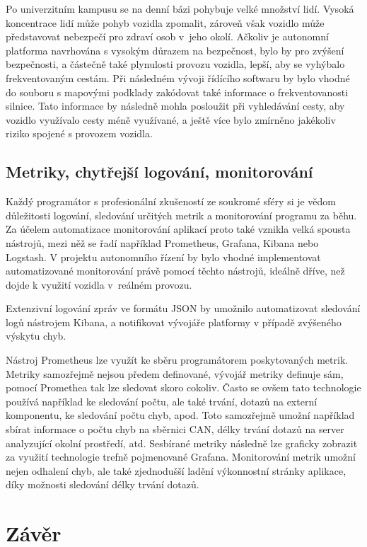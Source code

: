 \documentclass[czech, bachelor]{diploma}
\begin{document}
Po univerzitním kampusu se na denní bázi pohybuje velké množství lidí. Vysoká koncentrace lidí může pohyb vozidla zpomalit,
zároveň však vozidlo může představovat nebezpečí pro zdraví osob v~jeho okolí. Ačkoliv je autonomní platforma navrhována s vysokým
důrazem na bezpečnost, bylo by pro zvýšení bezpečnosti, a částečně také plynulosti provozu vozidla, lepší, aby se vyhýbalo
frekventovaným cestám. Při následném vývoji řídícího softwaru by bylo vhodné do souboru s mapovými podklady zakódovat také
informace o frekventovanosti silnice. Tato informace by následně mohla posloužit při vyhledávání cesty, aby vozidlo využívalo
cesty méně využívané, a ještě více bylo zmírněno jakékoliv riziko spojené s provozem vozidla.

\section{Metriky, chytřejší logování, monitorování}

Každý programátor s profesionální zkušeností ze soukromé sféry si je vědom důležitosti logování, sledování určitých metrik
a monitorování programu za běhu. Za účelem automatizace monitorování aplikací proto také vznikla velká spousta nástrojů, mezi něž
se řadí například Prometheus, Grafana, Kibana nebo Logstash. V projektu autonomního řízení by bylo vhodné implementovat
automatizované monitorování právě pomocí těchto nástrojů, ideálně dříve, než dojde k využití vozidla v~reálném provozu.

Extenzivní logování zpráv ve formátu JSON by umožnilo automatizovat sledování logů nástrojem Kibana, a notifikovat vývojáře
platformy v případě zvýšeného výskytu chyb.

Nástroj Prometheus lze využít ke sběru programátorem poskytovaných metrik. Metriky samozřejmě nejsou předem definované, vývojář
metriky definuje sám, pomocí Promethea tak lze sledovat skoro cokoliv. Často se ovšem tato technologie používá například
ke sledování počtu, ale také trvání, dotazů na externí komponentu, ke sledování počtu chyb, apod. Toto samozřejmě umožní například
sbírat informace o počtu chyb na sběrnici CAN, délky trvání dotazů na server analyzující okolní prostředí, atd. Sesbírané metriky
následně lze graficky zobrazit za využití technologie trefně pojmenované Grafana. Monitorování metrik umožní nejen odhalení chyb,
ale také zjednodušší ladění výkonnostní stránky aplikace, díky možnosti sledování délky trvání dotazů.

\chapter{Závěr}
\end{document}
